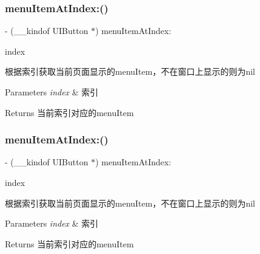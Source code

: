 \subsubsection{\texorpdfstring{menu\+Item\+At\+Index\+:()}{menuItemAtIndex:()}\hspace{0.1cm}{\footnotesize\ttfamily [1/3]}}
{\footnotesize\ttfamily -\/ (\+\_\+\+\_\+kindof U\+I\+Button $\ast$) menu\+Item\+At\+Index\+: \begin{DoxyParamCaption}\item[{(N\+S\+U\+Integer)}]{index }\end{DoxyParamCaption}}

根据索引获取当前页面显示的menu\+Item，不在窗口上显示的则为nil


\begin{DoxyParams}{Parameters}
{\em index} & 索引\\
\hline
\end{DoxyParams}
\begin{DoxyReturn}{Returns}
当前索引对应的menu\+Item 
\end{DoxyReturn}
\mbox{\label{interface_v_t_magic_view_a865a894c24bdce6783fd3bd8d9152400}} 
\subsubsection{\texorpdfstring{menu\+Item\+At\+Index\+:()}{menuItemAtIndex:()}\hspace{0.1cm}{\footnotesize\ttfamily [2/3]}}
{\footnotesize\ttfamily -\/ (\+\_\+\+\_\+kindof U\+I\+Button $\ast$) menu\+Item\+At\+Index\+: \begin{DoxyParamCaption}\item[{(N\+S\+U\+Integer)}]{index }\end{DoxyParamCaption}}

根据索引获取当前页面显示的menu\+Item，不在窗口上显示的则为nil


\begin{DoxyParams}{Parameters}
{\em index} & 索引\\
\hline
\end{DoxyParams}
\begin{DoxyReturn}{Returns}
当前索引对应的menu\+Item 
\end{DoxyReturn}
\mbox{\label{interface_v_t_magic_view_a20cac7e2a625740dcdceaee4acaaad8d}} 
